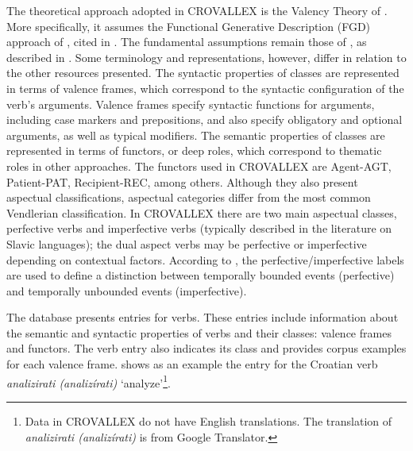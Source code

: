 \documentclass[english]{textolivre}
\begin{document}
The theoretical approach adopted in CROVALLEX is the Valency Theory of \textcite{tesniere_ements_1959}. More specifically, it assumes the Functional Generative Description (FGD) approach of \textcite{hajicova_manual_2002}, cited in \textcite{preradovic_crovallex:_2009}. The fundamental assumptions remain those of \textcite{levin_english_1993}, as described in . Some terminology and representations, however, differ in relation to the other resources presented. The syntactic properties of classes are represented in terms of valence frames, which correspond to the syntactic configuration of the verb’s arguments. Valence frames specify syntactic functions for arguments, including case markers and prepositions, and also specify obligatory and optional arguments, as well as typical modifiers. The semantic properties of classes are represented in terms of functors, or deep roles, which correspond to thematic roles in other approaches. The functors used in CROVALLEX are Agent-AGT, Patient-PAT, Recipient-REC, among others. Although they also present aspectual classifications, aspectual categories differ from the most common Vendlerian classification. In CROVALLEX there are two main aspectual classes, perfective verbs and imperfective verbs (typically described in the literature on Slavic languages); the dual aspect verbs may be perfective or imperfective depending on contextual factors. According to \textcite{croft_verbsaspect_2012}, the perfective/imperfective labels are used to define a distinction between temporally bounded events (perfective) and temporally unbounded events (imperfective).

The database presents entries for verbs. These entries include information about the semantic and syntactic properties of verbs and their classes: valence frames and functors. The verb entry also indicates its class and provides corpus examples for each valence frame.  shows as an example the entry for the Croatian verb \textit{analizirati (analizírati)} ‘analyze’\footnote{Data in CROVALLEX do not have English translations. The translation of \textit{analizirati (analizírati)} is from Google Translator.}. 
\end{document}
